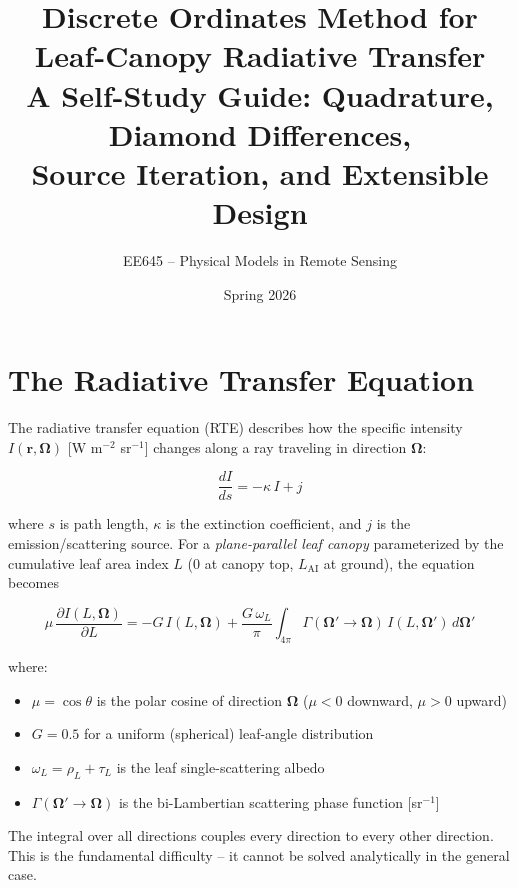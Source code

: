 \documentclass[12pt]{article}
\title{
  \textbf{Discrete Ordinates Method for Leaf-Canopy Radiative Transfer}\\[0.5em]
  \large A Self-Study Guide: Quadrature, Diamond Differences,\\
  Source Iteration, and Extensible Design
}
\author{EE645 -- Physical Models in Remote Sensing}
\date{Spring 2026}
\begin{document}
\maketitle
\tableofcontents
\newpage

\section{The Radiative Transfer Equation}

The radiative transfer equation (RTE) describes how the specific intensity
$I(\mathbf{r}, \boldsymbol{\Omega})$ [W m$^{-2}$ sr$^{-1}$] changes along a
ray traveling in direction $\boldsymbol{\Omega}$:

\begin{equation}
  \frac{dI}{ds} = -\kappa\,I + j
\end{equation}

where $s$ is path length, $\kappa$ is the extinction coefficient, and $j$ is
the emission/scattering source. For a \emph{plane-parallel leaf canopy}
parameterized by the cumulative leaf area index $L$ (0 at canopy top,
$L_\mathrm{AI}$ at ground), the equation becomes

\begin{equation}
  \label{eq:rte}
  \mu\,\frac{\partial I(L,\boldsymbol{\Omega})}{\partial L}
  = -G\,I(L,\boldsymbol{\Omega})
    + \frac{G\,\omega_L}{\pi}\int_{4\pi}
      \Gamma(\boldsymbol{\Omega}'\!\to\!\boldsymbol{\Omega})\,
      I(L,\boldsymbol{\Omega}')\,d\boldsymbol{\Omega}'
\end{equation}

where:
\begin{itemize}[nosep]
  \item $\mu = \cos\theta$ is the polar cosine of direction $\boldsymbol{\Omega}$
        ($\mu < 0$ downward, $\mu > 0$ upward)
  \item $G = 0.5$ for a uniform (spherical) leaf-angle distribution
  \item $\omega_L = \rho_L + \tau_L$ is the leaf single-scattering albedo
  \item $\Gamma(\boldsymbol{\Omega}'\!\to\!\boldsymbol{\Omega})$ is the
        bi-Lambertian scattering phase function [sr$^{-1}$]
\end{itemize}

The integral over all directions couples every direction to every other
direction. This is the fundamental difficulty -- it cannot be solved
analytically in the general case.
\end{document}

